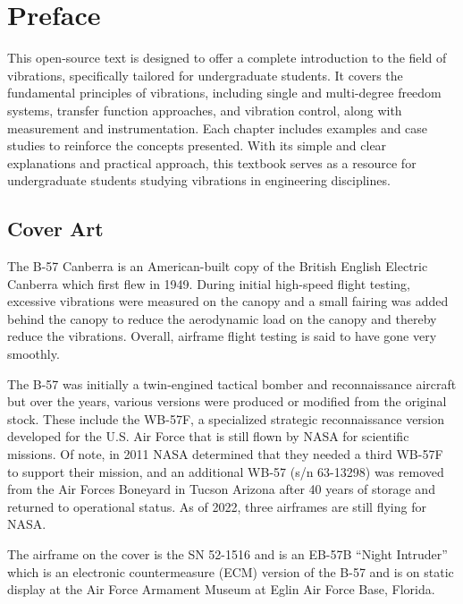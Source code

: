 \documentclass[12pt,letter]{article}
\begin{document}
\pagebreak

\setcounter{secnumdepth}{0} %

\section{Preface}
This open-source text is designed to offer a complete introduction to the field of vibrations, specifically tailored for undergraduate students. It covers the fundamental principles of vibrations, including single and multi-degree freedom systems, transfer function approaches, and vibration control, along with measurement and instrumentation. Each chapter includes examples and case studies to reinforce the concepts presented. With its simple and clear explanations and practical approach, this textbook serves as a resource for undergraduate students studying vibrations in engineering disciplines.

\subsection{Cover Art}
The B-57 Canberra is an American-built copy of the British English Electric Canberra which first flew in 1949. During initial high-speed flight testing, excessive vibrations were measured on the canopy and a small fairing was added behind the canopy to reduce the aerodynamic load on the canopy and thereby reduce the vibrations. Overall, airframe flight testing is said to have gone very smoothly. 

The B-57 was initially a twin-engined tactical bomber and reconnaissance aircraft but over the years, various versions were produced or modified from the original stock. These include the WB-57F, a specialized strategic reconnaissance version developed for the U.S. Air Force that is still flown by NASA for scientific missions. Of note, in 2011 NASA determined that they needed a third WB-57F to support their mission, and an additional WB-57 (s/n 63-13298) was removed from the Air Forces Boneyard in Tucson Arizona after 40 years of storage and returned to operational status. As of 2022, three airframes are still flying for NASA.

The airframe on the cover is the SN 52-1516 and is an EB-57B ``Night Intruder'' which is an electronic countermeasure (ECM) version of the B-57 and is on static display at the Air Force Armament Museum at Eglin Air Force Base, Florida. 
\end{document}
